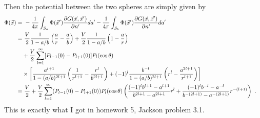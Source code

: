 \documentclass[12pt]{article}
\begin{document}
Then the potential between the two spheres are simply given by
\begin{align}
    \Phi(\vec x) =&~ - \frac{1}{4\pi} \int_{S_a} \Phi(\vec x') \frac{\partial G(\vec x, \vec x')}{\partial n'} da' - \frac{1}{4\pi} \int_{S_b} \Phi(\vec x') \frac{\partial G(\vec x, \vec x')}{\partial n'}da'\cr
    =&~ \frac{V}{2} \frac{1}{1-a/b}\left(\frac{a}{r} - \frac{a}{b}\right) + \frac{V}{2} \frac{1}{1-a/b}\left(1 - \frac{a}{r}\right) \cr
    &+ \frac{V}{2} \sum_{l = 1}^\infty [P_{l-1}(0)-P_{l+1}(0)]P_l(\cos \theta) \cr
    & \times \left[\frac{a^{l+1}}{1-(a/b)^{2l+1}}\left(\frac{1}{r^{l+1}} - \frac{r^l}{b^{2l+1}}\right) + (-1)^l \frac{b^{-l}}{1-(a/b)^{2l+1}} \left(r^l - \frac{a^{2l+1}}{r^{l+1}}\right)\right]\cr
    =&~ \frac{V}{2} + \frac{V}{2}\sum_{l=1}^\infty(P_{l-1}(0) - P_{l+1}(0)) P_l(\cos\theta) \left(
        \frac{(-1)^l b^{l+1} - a^{l+1} }{b^{2l+1} - a^{2l+1} }r^l + \frac{(-1)^l b^{-l}-a^{-l} }{b^{-(2l+1)} - a^{-(2l+1)} } r^{-(l+1)}
    \right)~.\nonumber
\end{align}
This is exactly what I got in homework 5, Jackson problem 3.1.
\end{document}
